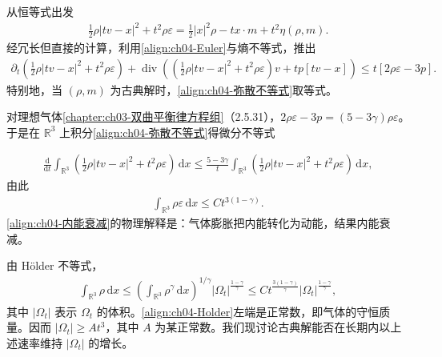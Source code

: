 ﻿\documentclass[../../main.tex]{subfiles}
\begin{document}
从恒等式出发
\begin{align}
\tfrac{1}{2}\rho|tv-x|^{2}+t^{2}\rho\varepsilon=\tfrac{1}{2}|x|^{2}\rho-tx\cdot m+t^{2}\eta(\rho,m).
\label{align:ch04-恒等式}
\end{align}
经冗长但直接的计算，利用\eqref{align:ch04-Euler}与熵不等式，推出
\begin{align}
\partial_{t}\left(\tfrac{1}{2}\rho|tv-x|^{2}+t^{2}\rho\varepsilon\right)+\operatorname{div}\left((\tfrac{1}{2}\rho|tv-x|^{2}+t^{2}\rho\varepsilon)v+tp[tv-x]\right)\leqslant t[2\rho\varepsilon-3p].
\label{align:ch04-弥散不等式}
\end{align}
特别地，当 $(\rho,m)$ 为古典解时，\eqref{align:ch04-弥散不等式}取等式。

对理想气体\cref{chapter:ch03-双曲平衡律方程组}（2.5.31），$2\rho\varepsilon-3p=(5-3\gamma)\rho\varepsilon$。于是在 $\mathbb{R}^{3}$ 上积分\eqref{align:ch04-弥散不等式}得微分不等式

\begin{align}
\frac{\mathrm{d}}{\mathrm{d}t}\int_{\mathbb{R}^{3}}\left(\tfrac{1}{2}\rho|tv-x|^{2}+t^{2}\rho\varepsilon\right)\,\mathrm{d}x\leqslant\frac{5-3\gamma}{t}\int_{\mathbb{R}^{3}}\left(\tfrac{1}{2}\rho|tv-x|^{2}+t^{2}\rho\varepsilon\right)\,\mathrm{d}x,
\label{align:ch04-弥散微分}
\end{align}
由此
\begin{align}
\int_{\mathbb{R}^{3}}\rho\varepsilon\,\mathrm{d}x\leqslant Ct^{3(1-\gamma)}.
\label{align:ch04-内能衰减}
\end{align}
\eqref{align:ch04-内能衰减}的物理解释是：气体膨胀把内能转化为动能，结果内能衰减。

由 Hölder 不等式，
\begin{align}
\int_{\mathbb{R}^{3}}\rho\,\mathrm{d}x\leqslant\left(\int_{\mathbb{R}^{3}}\rho^{\gamma}\,\mathrm{d}x\right)^{1/\gamma}|\Omega_{t}|^{\frac{1-\gamma}{\gamma}}\leqslant Ct^{\frac{3(1-\gamma)}{\gamma}}|\Omega_{t}|^{\frac{1-\gamma}{\gamma}},
\label{align:ch04-Holder}
\end{align}
其中 $|\Omega_{t}|$ 表示 $\Omega_{t}$ 的体积。\eqref{align:ch04-Holder}左端是正常数，即气体的守恒质量。因而 $|\Omega_{t}|\geqslant At^{3}$，其中 $A$ 为某正常数。我们现讨论古典解能否在长期内以上述速率维持 $|\Omega_{t}|$ 的增长。
\end{document}
